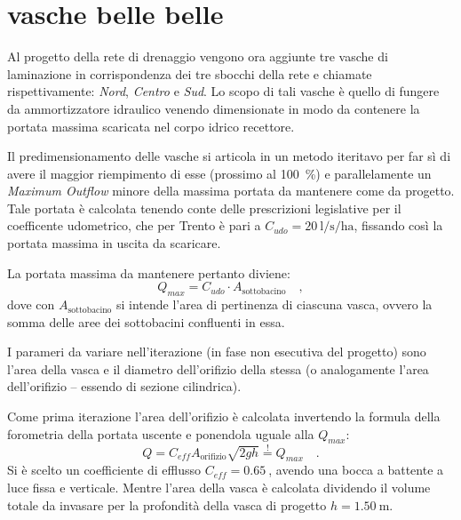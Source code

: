 \chapter{vasche belle  belle}
Al progetto della rete di drenaggio vengono ora aggiunte tre vasche di laminazione in corrispondenza dei tre sbocchi della rete e chiamate rispettivamente: \emph{Nord}, \emph{Centro} e \emph{Sud}.
Lo scopo di tali vasche è quello di fungere da ammortizzatore idraulico venendo dimensionate in modo da contenere la portata massima scaricata nel corpo idrico recettore.

Il predimensionamento delle vasche si articola in un metodo iteritavo per far sì di avere il maggior riempimento di esse (prossimo al \SI{100}{\percent}) e parallelamente un \emph{Maximum Outflow} minore della massima portata da mantenere come da progetto. 
Tale portata è calcolata tenendo conte delle prescrizioni legislative per il coefficente udometrico, che per Trento è pari a $C_{udo} = \SI{20}{\litre\per\second\per\hectare}$, fissando così la portata massima in uscita da scaricare. 

La portata massima da mantenere pertanto diviene:
\begin{equation}
    Q_{max} = C_{udo} \cdot A_{\text{sottobacino}}
    \label{eq:qmax} \quad ,
\end{equation}
dove con $A_{\text{sottobacino}}$ si intende l'area di pertinenza di ciascuna vasca, ovvero la somma delle aree dei sottobacini confluenti in essa.

I parameri da variare nell'iterazione (in fase non esecutiva del progetto) sono l'area della vasca e il diametro dell'orifizio della stessa (o analogamente l'area dell'orifizio -- essendo di sezione cilindrica). 


Come prima iterazione l'area dell'orifizio è calcolata invertendo la formula della forometria della portata uscente e ponendola uguale alla $Q_{max}$:
\begin{equation}
    Q  = C_{eff} A_{\text{orifizio}} \sqrt{2 g h} \overset{!}{=} Q_{max} \quad .
\end{equation}
Si è scelto un coefficiente di efflusso $C_{eff} = \SI{0.65}{}$, avendo una bocca a battente a luce fissa e verticale. 
Mentre l'area della vasca è calcolata dividendo il volume totale da invasare per la profondità della vasca di progetto $h = \SI{1.50}{\metre}$.


